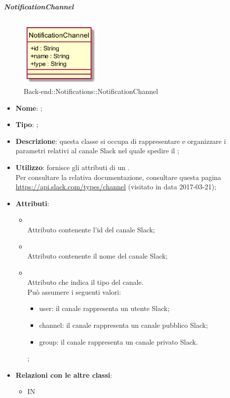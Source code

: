 \hypertarget{NotificationChannel_label}{\subparagraph{NotificationChannel}}
\begin{figure}[h]
	\centering
	\includegraphics[width=0.35\textwidth,height=\textheight,keepaspectratio]{images/ClassNotificationChannel.png}
	\caption{Back-end::Notifications::NotificationChannel}
\end{figure}
\begin{itemize}
	\item \textbf{Nome}: ;
	\item \textbf{Tipo}: ;
	\item \textbf{Descrizione}: questa classe si occupa di rappresentare e organizzare i parametri relativi al canale Slack nel quale spedire il ;
	\item \textbf{Utilizzo}: fornisce gli attributi di un . \\
Per consultare la relativa documentazione, consultare questa pagina \url{https://api.slack.com/types/channel} (visitato in data 2017-03-21);
	\item \textbf{Attributi}:
	\begin{itemize}
		\item[]  \\
		Attributo contenente l'id del canale Slack;
		\item[]  \\
		Attributo contenente il nome del canale Slack;
		\item[]  \\
		Attributo che indica il tipo del canale. \\ Può assumere i seguenti valori:
\begin{itemize}
  \item user: il canale rappresenta un utente Slack;
  \item channel: il canale rappresenta un canale pubblico Slack;
  \item group: il canale rappresenta un canale privato Slack.
\end{itemize};
	\end{itemize}
	\item \textbf{Relazioni con le altre classi}:
	\begin{itemize}
		\item IN \hyperlink{NotificationService_label}{}
	\end{itemize}
\end{itemize}
\FloatBarrier

